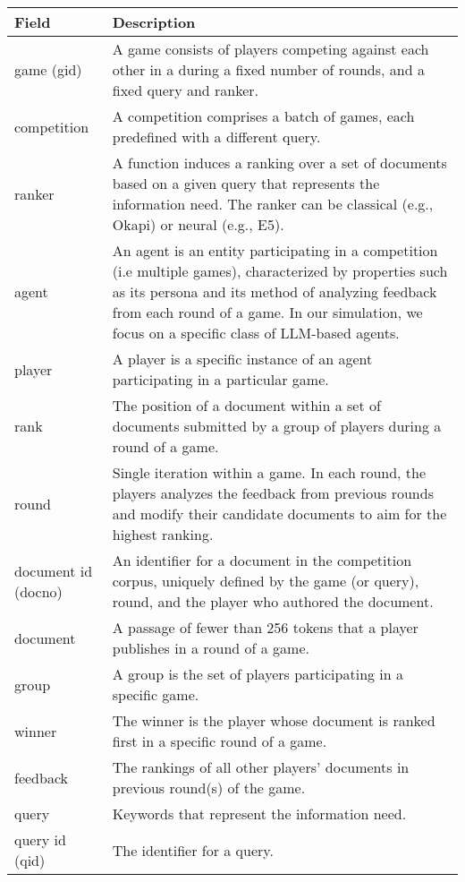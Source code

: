 \begin{tabular}{|p{2cm}|p{10cm}|}
\hline
\textbf{Field} & \textbf{Description} \\ 
\hline
game (gid) & A game consists of players competing against each other in a during a fixed number of rounds, and a fixed query and ranker. \\
\hline
competition & A competition comprises a batch of games, each predefined with a different query. \\
\hline
ranker & A function induces a ranking over a set of documents based on a given query that represents the information need. The ranker can be classical (e.g., Okapi) or neural (e.g., E5). \\
\hline
agent & An agent is an entity participating in a competition (i.e multiple games), characterized by properties such as its persona and its method of analyzing feedback from each round of a game. In our simulation, we focus on a specific class of LLM-based agents.  \\
\hline
player & A player is a specific instance of an agent participating in a particular game. \\
\hline
rank & The position of a document within a set of documents submitted by a group of players during a round of a game. \\
\hline
round & Single iteration within a game. In each round, the players analyzes the feedback from previous rounds and modify their candidate documents to aim for the highest ranking. \\
\hline
document id (docno) & An identifier for a document in the competition corpus, uniquely defined by the game (or query), round, and the player who authored the document. \\
\hline
document & A passage of fewer than 256 tokens that a player publishes in a round of a game. \\
\hline
group & A group is the set of players participating in a specific game. \\
\hline
winner & The winner is the player whose document is ranked first in a specific round of a game. \\
\hline
feedback & The rankings of all other players' documents in previous round(s) of the game. \\
\hline
query & Keywords that represent the information need. \\
\hline
query id (qid) & The identifier for a query. \\
\hline
\end{tabular}